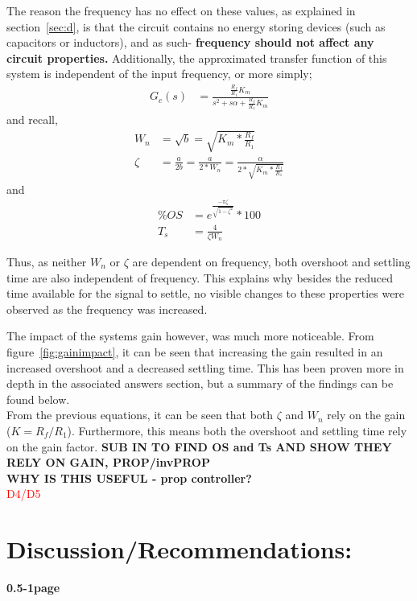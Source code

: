 \documentclass[11pt,a4paper]{article}
\begin{document}
The reason the frequency has no effect on these values, as explained in section~\ref{sec:d}, is that the circuit contains no energy storing devices (such as capacitors or inductors), and as such- \textbf{frequency should not affect any circuit properties.} Additionally, the approximated transfer function of this system is independent of the input frequency, or more simply;
\begin{align*}
G_c(s) &= \frac{\frac{R_f}{R_1}K_m} {s^2 + s\alpha + \frac{R_f}{R_1}K_m}
\end{align*}
and recall, 
\begin{align*}
W_n &= \sqrt{b} = \sqrt{K_m * \frac{R_f}{R_1}} \\
\zeta &= \frac{a}{2b} = \frac{a}{2*W_n} = \frac{\alpha}{2*\sqrt{K_m * \frac{R_f}{R_1}}}
\end{align*}
and
\begin{align*}
\%OS &= e^{\frac{-\pi \zeta}{\sqrt{1-\zeta^2}}} * 100 \\
T_s &= \frac{4}{\zeta W_n}
\end{align*}

Thus, as neither $W_n$ or $\zeta$ are dependent on frequency, both overshoot and settling time are also independent of frequency. 
This explains why besides the reduced time available for the signal to settle, no visible changes to these properties were observed as the frequency was increased. 

The impact of the systems gain however, was much more noticeable. From figure~\ref{fig:gainimpact}, it can be seen that increasing the gain resulted in an increased overshoot and a decreased settling time. This has been proven more in depth in the associated answers section, but a summary of the findings can be found below.  \\
From the previous equations, it can be seen that both $\zeta$ and $W_n$ rely on the gain ($K = R_f/R_1$). Furthermore, this means both the overshoot and settling time rely on the gain factor.
\textbf{SUB IN TO FIND OS and Ts AND SHOW THEY RELY ON GAIN, PROP/invPROP}\\
\textbf{WHY IS THIS USEFUL - prop controller?}\\
\textcolor{red}{D4/D5}



\pagebreak
\section{Discussion/Recommendations:}
\textbf{0.5-1page}\\
\end{document}
